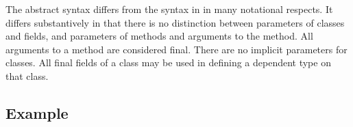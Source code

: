 \documentclass{article}
\begin{document}

The abstract syntax differs from the syntax in \cite{DependentTypes}
in many notational respects. It differs substantively in that there is
no distinction between parameters of classes and fields, and
parameters of methods and arguments to the method. All arguments to a
method are considered final. There are no implicit parameters for
classes.  All final fields of a class may be used in defining a
dependent type on that class.

\subsection{Example}
\end{document}
